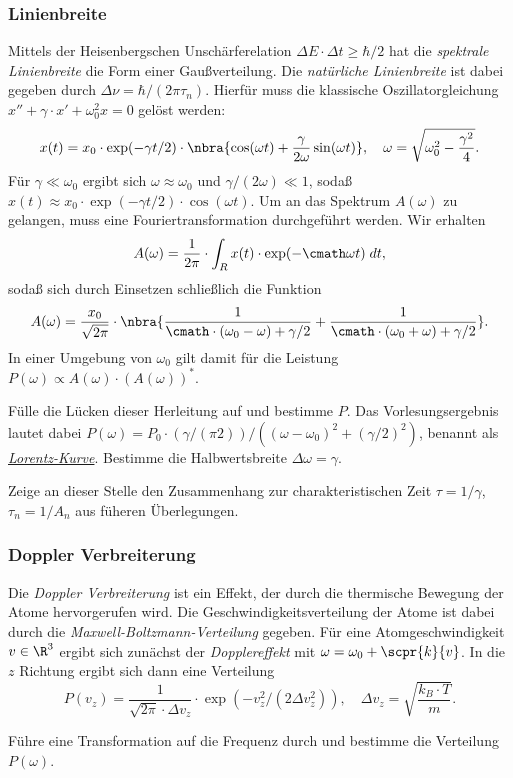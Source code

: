 \documentclass{subfiles}
\begin{document}
        \subsubsection*{Linienbreite}
            Mittels der Heisenbergschen Unschärferelation $\Delta E\cdot\Delta t\geq\hbar/2$ hat die \emph{spektrale Linienbreite} die Form einer Gaußverteilung. Die \emph{natürliche Linienbreite} ist dabei gegeben durch $\Delta\nu = \hbar/(2\pi\tau_n)$. Hierfür muss die klassische Oszillatorgleichung $x'' + \gamma\cdot x' + \omega_0^2 x = 0$ gelöst werden:
            \[
                x(t) = x_0\cdot\exp(-\gamma t/2)\cdot\nbra{\cos(\omega t) + \frac{\gamma}{2\omega}\sin(\omega t)},\quad \omega = \sqrt{\omega_0^2 - \frac{\gamma^2}{4}}.
            \]
            Für $\gamma\ll\omega_0$ ergibt sich $\omega \approx\omega_0$ und $\gamma/(2\omega)\ll 1$, sodaß $x(t) \approx x_0\cdot\exp(-\gamma t/2)\cdot\cos(\omega t)$. Um an das Spektrum $A(\omega)$ zu gelangen, muss eine Fouriertransformation durchgeführt werden. Wir erhalten
            \[
                A(\omega) = \frac{1}{2\pi}\cdot\int_R x(t)\cdot\exp(-\cmath\omega t)\;dt,
            \]
            sodaß sich durch Einsetzen schließlich die Funktion
            \[
                A(\omega) = \frac{x_0}{\sqrt{2\pi}}\cdot\nbra{\frac{1}{\cmath\cdot(\omega_0 - \omega) + \gamma/2} + \frac{1}{\cmath\cdot(\omega_0 + \omega) + \gamma/2}}.
            \]
            In einer Umgebung von $\omega_0$ gilt damit für die Leistung $P(\omega) \propto A(\omega)\cdot (A(\omega))^*$. 

            \begin{Aufgabe}
                \nr{} Fülle die Lücken dieser Herleitung auf und bestimme $P$. Das Vorlesungsergebnis lautet dabei $P(\omega) = P_0\cdot (\gamma/(\pi2))/((\omega-\omega_0)^2 + (\gamma/2)^2)$, benannt als \href{https://de.wikipedia.org/wiki/Lorentzkurve}{\emph{Lorentz-Kurve}}. Bestimme die Halbwertsbreite $\Delta\omega = \gamma$.
                
                \nr{} Zeige an dieser Stelle den Zusammenhang zur charakteristischen Zeit $\tau = 1/\gamma$, $\tau_n = 1/A_n$ aus füheren Überlegungen. 
            \end{Aufgabe}

        \subsubsection*{Doppler Verbreiterung}
            Die \emph{Doppler Verbreiterung} ist ein Effekt, der durch die thermische Bewegung der Atome hervorgerufen wird. Die Geschwindigkeitsverteilung der Atome ist dabei durch die \emph{Maxwell-Boltzmann-Verteilung} gegeben. Für eine Atomgeschwindigkeit $v\in\R^3$ ergibt sich zunächst der \emph{Dopplereffekt} mit $\omega = \omega_0 + \scpr{k}{v}$. In die $z$ Richtung ergibt sich dann eine Verteilung 
            \[
                P(v_z) = \frac{1}{\sqrt{2\pi}\cdot\Delta v_z}\cdot\exp(-v_z^2/(2\Delta v_z^2)),\quad \Delta v_z = \sqrt{\frac{k_B\cdot T}{m}}.
            \]
            \begin{Aufgabe}
                \nr{} Führe eine Transformation auf die Frequenz durch und bestimme die Verteilung $P(\omega)$. 
            \end{Aufgabe}
\end{document}
